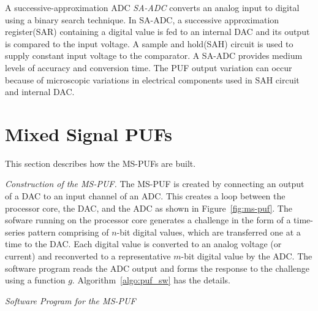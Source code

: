 A successive-approximation ADC {\em SA-ADC} converts an analog
input to digital using a binary search technique.
In SA-ADC, a successive approximation register(SAR) containing 
a digital value is fed to an internal DAC and its output is 
compared to the input voltage. A sample and hold(SAH) circuit 
is used to supply constant input voltage to the comparator. 
A SA-ADC provides medium levels of accuracy and conversion time. 
The PUF output variation can occur because of microscopic variations 
in electrical components used in SAH circuit and internal DAC.


\section{Mixed Signal PUFs}
This section describes how the MS-PUFs are built.

{\flushleft \em Construction of the MS-PUF. }
The MS-PUF is created by connecting an output of a DAC to an
input channel of an ADC. This creates a loop between the processor
core, the DAC, and the ADC as shown in Figure~\ref{fig:ms-puf}.
The sofware running on the processor core 
generates a challenge in the form of a time-series pattern
comprising of $n$-bit digital values, which are transferred one at a time
to the DAC. Each digital value is converted to an analog voltage (or
current) and reconverted to a representative $m$-bit digital value by the ADC.
The software program reads the
ADC output and forms the response to the challenge using a function $g$.
Algorithm~\ref{algo:puf_sw} has the details.

\begin{algorithm}[!ht] \label{algo:puf_sw}
\begin{scriptsize}
	\caption{\emph{Software Program for the MS-PUF}}
	\DontPrintSemicolon
\end{scriptsize}
\end{algorithm}

